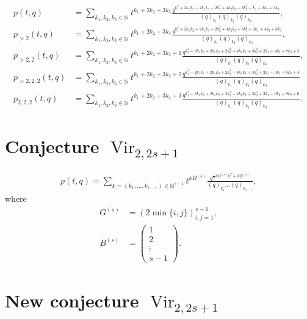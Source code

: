 \documentclass[a4paper, 12pt, reqno]{amsart}
\DeclareMathOperator{\Vir}{Vir}
\begin{document}
\begin{align*}
  p(t, q) &= \sum_{k_1, k_2, k_3 \in \mathbb{N}}t^{k_1 + 2k_2 + 3k_3}\frac{q^{k_1^2 + 2k_1k_2 + 2k_1k_3 + 2k_2^2 + 4k_2k_3 + 3k_3^2 + k_1 + 2k_2 + 3k_3}}{(q)_{k_1}(q)_{k_2}(q)_{k_3}}, \\
  p_{>2}(t, q) &= \sum_{k_1, k_2, k_3 \in \mathbb{N}}t^{k_1 + 2k_2 + 3k_3}\frac{q^{k_1^2 + 2k_1k_2 + 2k_1k_3 + 2k_2^2 + 4k_2k_3 + 3k_3^2 + 2k_1 + 4k_2 + 6k_3}}{(q)_{k_1}(q)_{k_2}(q)_{k_3}}, \\
  p_{>2, 2}(t, q) &= \sum_{k_1, k_2, k_3 \in \mathbb{N}}t^{k_1 + 2k_2 + 3k_3 + 1}\frac{q^{k_1^2 + 2k_1k_2 + 2k_1k_3 + 2k_2^2 + 4k_2k_3 + 3k_3^2 + 2k_1 + 4k_2 + 7k_3 + 2}}{(q)_{k_1}(q)_{k_2}(q)_{k_3}}, \\
  p_{>2, 2, 2}(t, q) &= \sum_{k_1, k_2, k_3 \in \mathbb{N}}t^{k_1 + 2k_2 + 3k_3 + 2}\frac{q^{k_1^2 + 2k_1k_2 + 2k_1k_3 + 2k_2^2 + 4k_2k_3 + 3k_3^2 + 2k_1 + 5k_2 + 8k_3 + 4}}{(q)_{k_1}(q)_{k_2}(q)_{k_3}} \\
  p_{2, 2, 2}(t, q) &= \sum_{k_1, k_2, k_3 \in \mathbb{N}}t^{k_1 + 2k_2 + 3k_3 + 3}\frac{q^{k_1^2 + 2k_1k_2 + 2k_1k_3 + 2k_2^2 + 4k_2k_3 + 3k_3^2 + 3k_1 + 6k_2 + 9k_3 + 6}}{(q)_{k_1}(q)_{k_2}(q)_{k_3}}.
\end{align*}

\section{Conjecture $\Vir_{2, 2s + 1}$}
\label{sec:conjecture}

\begin{align*}
  p(t, q) = \sum_{k = (k_1, \dots, k_{s - 1}) \in \mathbb{N}^{s - 1}}t^{kB^{(s)}}\frac{q^{\frac{1}{2}kG^{(s)}k^T + kB^{(s)}}}{(q)_{k_1}\dots (q)_{k_{s - 1}}},
\end{align*}
where
\begin{align*}
  G^{(s)} &= (2\min\{i, j\})_{i, j = 1}^{s - 1}, \\
  B^{(s)} &=
            \left(\begin{smallmatrix}
                    1 \\
                    2 \\
                    \vdots \\
                    s - 1
                  \end{smallmatrix}\right).
\end{align*}

\section{New conjecture $\Vir_{2, 2s + 1}$}
\label{sec:new-conjecture-vir_2}
\end{document}
